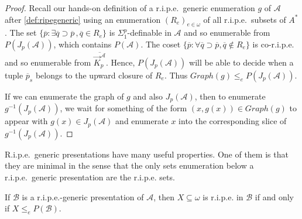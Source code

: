\documentclass[11pt]{amsart}
\newcommand{\A}{{\mathcal{A}}}
\newcommand{\B}{{\mathcal{B}}}
\renewcommand{\bar}[1]{\overline{#1}}
\DeclareMathOperator{\emptystring}{\langle\rangle}
\newcommand{\oneone}{1{-}1}
\begin{document}
\begin{proof}
    Recall our hands-on definition of a r.i.p.e.\ generic enumeration $g$ of $\A$ after \cref{def:ripegeneric} using an enumeration $(R_e)_{e\in\omega}$ of all r.i.p.e.\ subsets of $A^*$.
    The set $\{ \bar p : \exists \bar q \supset \bar p \,, \bar q \in R_e\}$ is $\Sigma_1^p$-definable in $\A$ and so enumerable from $P(J_p(\A))$, which contains $P(\A)$. The coset $\{ \bar p : \forall \bar q \supset \bar p, \bar q \not \in R_e\}$ is co-r.i.p.e. and so enumerable from $\overline{\vec K^\A_p}$. Hence, $P(J_p(\A))$ will be able to decide when a tuple $\bar p_s$ belongs to the upward closure of $R_e$. Thus $Graph(g) \leq_e P(J_p(\A))$.
    
    If we can enumerate the graph of $g$ and also $J_p(\A)$, then to enumerate $g^{-1}(J_p(\A))$, we wait for something of the form $(x,g(x)) \in Graph(g)$ to appear with $g(x) \in J_p(\A)$ and enumerate $x$ into the corresponding slice of $g^{-1}(J_p(\A))$.
\end{proof}
R.i.p.e.\ generic presentations have many useful properties. One of them is that they are minimal in the sense that the only sets enumeration below a r.i.p.e.\ generic presentation are the r.i.p.e. sets.
\begin{lem}\label{generic-ish}%
    If $\B$ is a r.i.p.e.-generic presentation of $\A$, then $X\subseteq \omega$ is r.i.p.e. in $\B$ if and only if $X\leq_e P(\B)$.
\end{lem}
\end{document}
